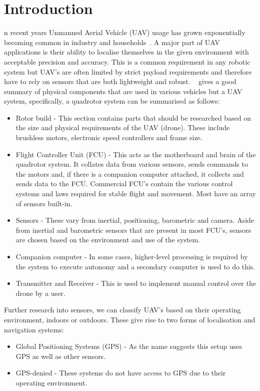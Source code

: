 \let\textcircled=\pgftextcircled
\chapter{Introduction}\label{ch:intro}%
    n recent years Unmanned Aerial Vehicle (UAV) usage has grown exponentially becoming common in industry and households~\cite{custers2016drones}.
    A major part of UAV applications is their ability to localise themselves in the given environment with acceptable precision and accuracy.
    This is a common requirement in any robotic system but UAV's are often limited by strict payload requirements and therefore have to rely on sensors that are both lightweight and robust.
    ~\citep{ardupilotadvanced} gives a good summary of physical components that are used in various vehicles but a UAV system, specifically, a quadrotor system can be summarised as follows:
    \begin{itemize}
        \item Rotor build - This section contains parts that should be researched based on the size and physical requirements of the UAV (drone).
        These include brushless motors, electronic speed controllers and frame size.
        \item Flight Controller Unit (FCU) - This acts as the motherboard and brain of the quadrotor system.
        It collates data from various sensors, sends commands to the motors and, if there is a companion computer attached, it collects and sends data to the FCU.
        Commercial FCU's contain the various control systems and laws required for stable flight and movement.
        Most have an array of sensors built-in.
        \item Sensors - These vary from inertial, positioning, barometric and camera.
        Aside from inertial and barometric sensors that are present in most FCU's, sensors are chosen based on the environment and use of the system.
        \item Companion computer - In some cases, higher-level processing is required by the system to execute autonomy and a secondary computer is used to do this.
        \item Transmitter and Receiver - This is used to implement manual control over the drone by a user.
    \end{itemize}

Further research into sensors, we can classify UAV's based on their operating environment, indoors or outdoors.
These give rise to two forms of localisation and navigation systems:
    \begin{itemize}
        \item Global Positioning Systems (GPS) - As the name suggests this setup uses GPS as well as other sensors.
        \item GPS-denied - These systems do not have access to GPS due to their operating environment.
    \end{itemize}

